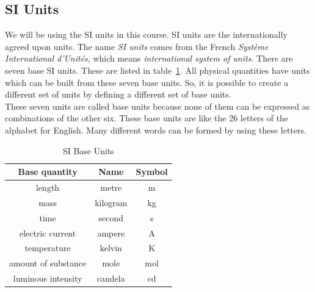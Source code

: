 \subsection*{SI Units}
            \nopagebreak
We will be using the SI units in this course. SI units are the internationally agreed upon units. 
  { The name \textsl{SI units} comes from the French \textsl{Syst\`{e}me International d'Unit\'{e}s}, which means \textsl{international system of units}.  } 
There are seven base SI units. These are listed in table~\ref{tab:units:SIunits}. All physical quantities have units which can be built from these seven base units. So, it is possible to create a different set of units by defining a different set of base units.\\
These seven units are called base units because none of them can be expressed as combinations of the other six. These base units are like the 26 letters of the alphabet for English. Many different words can be formed by using these letters.\par 
\begin{table}[H]
\centering
\begin{tabular}{|c|c|c|}\hline
\textbf{Base quantity} & \textbf{Name} & \textbf{Symbol} \\
\hline length & metre & m\\ \hline 
mass & kilogram & kg\\ \hline 
time & second & s\\ \hline 
electric current & ampere& A\\ \hline temperature & kelvin & K\\ \hline 
amount of substance & mole & mol\\ \hline 
luminous intensity & candela & cd\\ \hline
\end{tabular}
\caption{SI Base Units}\label{tab:units:SIunits}
\end{table}
